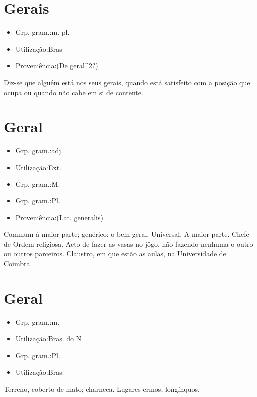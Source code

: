 \section{Gerais}
\begin{itemize}
\item {Grp. gram.:m. pl.}
\end{itemize}
\begin{itemize}
\item {Utilização:Bras}
\end{itemize}
\begin{itemize}
\item {Proveniência:(De \textunderscore geral\textunderscore ^2?)}
\end{itemize}
Diz-se que alguém está nos seus \textunderscore gerais\textunderscore , quando está satisfeito com a posição que ocupa ou quando não cabe em si de contente.
\section{Geral}
\begin{itemize}
\item {Grp. gram.:adj.}
\end{itemize}
\begin{itemize}
\item {Utilização:Ext.}
\end{itemize}
\begin{itemize}
\item {Grp. gram.:M.}
\end{itemize}
\begin{itemize}
\item {Grp. gram.:Pl.}
\end{itemize}
\begin{itemize}
\item {Proveniência:(Lat. \textunderscore generalis\textunderscore )}
\end{itemize}
Commum á maior parte; genérico: \textunderscore o bem geral\textunderscore .
Universal.
A maior parte.
Chefe de Ordem religiosa.
Acto de fazer as vasas no jôgo, não fazendo nenhuma o outro ou outros parceiros.
Claustro, em que estão as aulas, na Universidade de Coimbra.
\section{Geral}
\begin{itemize}
\item {Grp. gram.:m.}
\end{itemize}
\begin{itemize}
\item {Utilização:Bras. do N}
\end{itemize}
\begin{itemize}
\item {Grp. gram.:Pl.}
\end{itemize}
\begin{itemize}
\item {Utilização:Bras}
\end{itemize}
Terreno, coberto de mato; charneca.
Lugares ermos, longínquos.
